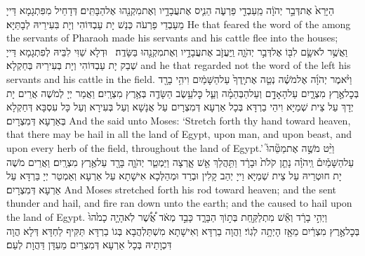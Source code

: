 {הַיָּרֵא֙ אֶת\maqqaf דְּבַ֣ר יְהֹוָ֔ה מֵֽעַבְדֵ֖י פַּרְעֹ֑ה הֵנִ֛יס אֶת\maqqaf עֲבָדָ֥יו וְאֶת\maqqaf מִקְנֵ֖הוּ אֶל\maqqaf הַבָּתִּֽים׃}
{דְּדָחֵיל מִפִּתְגָמָא דַּייָ מֵעַבְדֵי פַרְעֹה כְּנַשׁ יָת עַבְדּוֹהִי וְיָת בִּעִירֵיהּ לְבָתַּיָּא׃}
{He that feared the word of the \lord\space among the servants of Pharaoh made his servants and his cattle flee into the houses;}{}
{וַאֲשֶׁ֥ר לֹא\maqqaf שָׂ֛ם לִבּ֖וֹ אֶל\maqqaf דְּבַ֣ר יְהֹוָ֑ה וַֽיַּעֲזֹ֛ב אֶת\maqqaf עֲבָדָ֥יו וְאֶת\maqqaf מִקְנֵ֖הוּ בַּשָּׂדֶֽה׃ \petucha }
{וּדְלָא שַׁוִּי לִבֵּיהּ לְפִתְגָמָא דַּייָ שְׁבַק יָת עַבְדּוֹהִי וְיָת בְּעִירֵיהּ בְּחַקְלָא׃}
{and he that regarded not the word of the \lord\space left his servants and his cattle in the field.}{}
{וַיֹּ֨אמֶר יְהֹוָ֜ה אֶל\maqqaf מֹשֶׁ֗ה נְטֵ֤ה אֶת\maqqaf יָֽדְךָ֙ עַל\maqqaf הַשָּׁמַ֔יִם וִיהִ֥י בָרָ֖ד בְּכׇל\maqqaf אֶ֣רֶץ מִצְרָ֑יִם עַל\maqqaf הָאָדָ֣ם וְעַל\maqqaf הַבְּהֵמָ֗ה וְעַ֛ל כׇּל\maqqaf עֵ֥שֶׂב הַשָּׂדֶ֖ה בְּאֶ֥רֶץ מִצְרָֽיִם׃}
{וַאֲמַר יְיָ לְמֹשֶׁה אֲרֵים יָת יְדָךְ עַל צֵית שְׁמַיָּא וִיהֵי בַרְדָּא בְּכָל אַרְעָא דְּמִצְרָיִם עַל אֲנָשָׁא וְעַל בְּעִירָא וְעַל כָּל עִסְבָּא דְּחַקְלָא בְּאַרְעָא דְּמִצְרָיִם׃}
{And the \lord\space said unto Moses: ‘Stretch forth thy hand toward heaven, that there may be hail in all the land of Egypt, upon man, and upon beast, and upon every herb of the field, throughout the land of Egypt.’}{}
{וַיֵּ֨ט מֹשֶׁ֣ה אֶת\maqqaf מַטֵּ֘הוּ֮ עַל\maqqaf הַשָּׁמַ֒יִם֒ וַֽיהֹוָ֗ה נָתַ֤ן קֹלֹת֙ וּבָרָ֔ד וַתִּ֥הֲלַךְ אֵ֖שׁ אָ֑רְצָה וַיַּמְטֵ֧ר יְהֹוָ֛ה בָּרָ֖ד עַל\maqqaf אֶ֥רֶץ מִצְרָֽיִם׃}
{וַאֲרֵים מֹשֶׁה יָת חוּטְרֵיהּ עַל צֵית שְׁמַיָּא וַייָ יְהַב קָלִין וּבְרַד וּמְהַלְּכָא אִישָׁתָא עַל אַרְעָא וְאַמְטַר יְיָ בַּרְדָּא עַל אַרְעָא דְּמִצְרָיִם׃}
{And Moses stretched forth his rod toward heaven; and the \lord\space sent thunder and hail, and fire ran down unto the earth; and the \lord\space caused to hail upon the land of Egypt.}{}
{וַיְהִ֣י בָרָ֔ד וְאֵ֕שׁ מִתְלַקַּ֖חַת בְּת֣וֹךְ הַבָּרָ֑ד כָּבֵ֣ד מְאֹ֔ד אֲ֠שֶׁ֠ר לֹֽא\maqqaf הָיָ֤ה כָמֹ֙הוּ֙ בְּכׇל\maqqaf אֶ֣רֶץ מִצְרַ֔יִם מֵאָ֖ז הָיְתָ֥ה לְגֽוֹי׃}
{וַהֲוָה בַרְדָּא וְאִישָׁתָא מִשְׁתַּלְהֲבָא בְּגוֹ בַרְדָּא תַּקִּיף לַחְדָּא דְּלָא הֲוָה דִּכְוָתֵיהּ בְּכָל אַרְעָא דְּמִצְרַיִם מֵעִדָּן דַּהֲוָת לְעַם׃}
